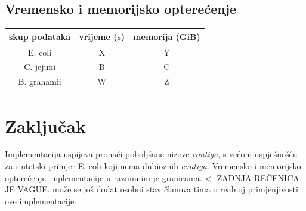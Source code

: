 \documentclass[times, utf8, seminar, numeric]{fer}
\begin{document}
\section{Vremensko i memorijsko opterećenje}

\begin{center}
\begin{tabular}[h]{|c||c|c|}
	\hline
	skup podataka & vrijeme (s) & memorija (GiB)\\
	\hline
	\hline
	E. coli & X & Y \\
	\hline
	C. jejuni & B & C \\
	\hline
	B. grahamii & W & Z \\
	\hline
\end{tabular}
\end{center}

\chapter{Zaključak}
Implementacija uspijeva pronaći poboljšane nizove \textit{contiga}, s većom uspješnošću za sintetski primjer E. coli koji nema dubioznih \textit{contiga}. Vremensko i memorijsko opterećenje implementacije u razumnim je granicama. <- ZADNJA REČENICA JE VAGUE. može se još dodat osobni stav članova tima o realnoj primjenjivosti ove implementacije.



\end{document}
